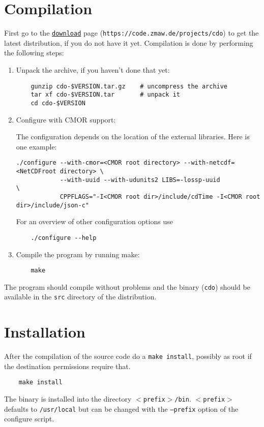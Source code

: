 \section{Compilation}

First go to the {\CDO}  \href{https://code.zmaw.de/projects/cdo}{\tt download} page
({\tt https://code.zmaw.de/projects/cdo}) to get the latest distribution,
if you do not have it yet.
Compilation is done by performing the following steps:

\begin{enumerate}
\item Unpack the archive, if you haven't done that yet:
   
\begin{verbatim}
    gunzip cdo-$VERSION.tar.gz    # uncompress the archive
    tar xf cdo-$VERSION.tar       # unpack it
    cd cdo-$VERSION
\end{verbatim}

\item Configure {\CDO} with CMOR support:

The configuration depends on the location of the external libraries. Here is one example:

\begin{verbatim}
./configure --with-cmor=<CMOR root directory> --with-netcdf=<NetCDFroot directory> \
            --with-uuid --with-udunits2 LIBS=-lossp-uuid                           \
            CPPFLAGS="-I<CMOR root dir>/include/cdTime -I<CMOR root dir>/include/json-c"
\end{verbatim}

For an overview of other configuration options use

\begin{verbatim}
    ./configure --help
\end{verbatim}

\item Compile the program by running make:

\begin{verbatim}
    make
\end{verbatim}

\end{enumerate}

The program should compile without problems and the binary ({\tt cdo}) 
should be available in the {\tt src} directory of the distribution.


\section{Installation}

After the compilation of the source code do a {\tt make install},
possibly as root if the destination permissions require that.

\begin{verbatim}
    make install
\end{verbatim} 

The binary is installed into the directory {\tt $<$prefix$>$/bin}.
{\tt $<$prefix$>$} defaults to {\tt /usr/local} but can be changed with 
the {\tt --prefix} option of the configure script. 
